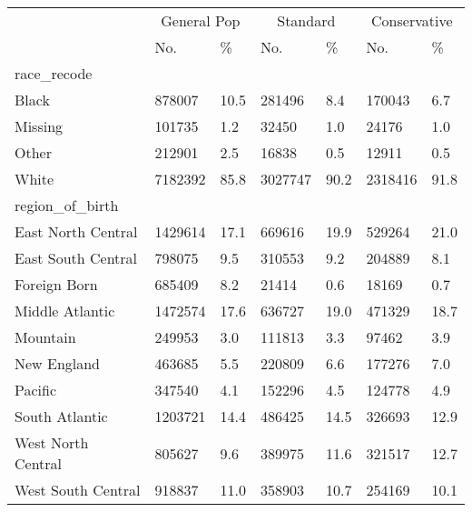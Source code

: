 \captionsetup[table]{labelformat=empty,skip=1pt}
\begin{longtable}{lllllll}
\toprule
 & \multicolumn{2}{c}{General Pop} & \multicolumn{2}{c}{Standard} & \multicolumn{2}{c}{Conservative} \\ 
 \cmidrule(lr){2-3} \cmidrule(lr){4-5} \cmidrule(lr){6-7}
 & No. & \% & No. & \% & No. & \% \\ 
\midrule
\multicolumn{1}{l}{race\_recode} \\ 
\midrule
Black & 878007 & 10.5 & 281496 & 8.4 & 170043 & 6.7 \\ 
Missing & 101735 & 1.2 & 32450 & 1.0 & 24176 & 1.0 \\ 
Other & 212901 & 2.5 & 16838 & 0.5 & 12911 & 0.5 \\ 
White & 7182392 & 85.8 & 3027747 & 90.2 & 2318416 & 91.8 \\ 
\midrule
\multicolumn{1}{l}{region\_of\_birth} \\ 
\midrule
East North Central & 1429614 & 17.1 & 669616 & 19.9 & 529264 & 21.0 \\ 
East South Central & 798075 & 9.5 & 310553 & 9.2 & 204889 & 8.1 \\ 
Foreign Born & 685409 & 8.2 & 21414 & 0.6 & 18169 & 0.7 \\ 
Middle Atlantic & 1472574 & 17.6 & 636727 & 19.0 & 471329 & 18.7 \\ 
Mountain & 249953 & 3.0 & 111813 & 3.3 & 97462 & 3.9 \\ 
New England & 463685 & 5.5 & 220809 & 6.6 & 177276 & 7.0 \\ 
Pacific & 347540 & 4.1 & 152296 & 4.5 & 124778 & 4.9 \\ 
South Atlantic & 1203721 & 14.4 & 486425 & 14.5 & 326693 & 12.9 \\ 
West North Central & 805627 & 9.6 & 389975 & 11.6 & 321517 & 12.7 \\ 
West South Central & 918837 & 11.0 & 358903 & 10.7 & 254169 & 10.1 \\ 
 \bottomrule
\end{longtable}

